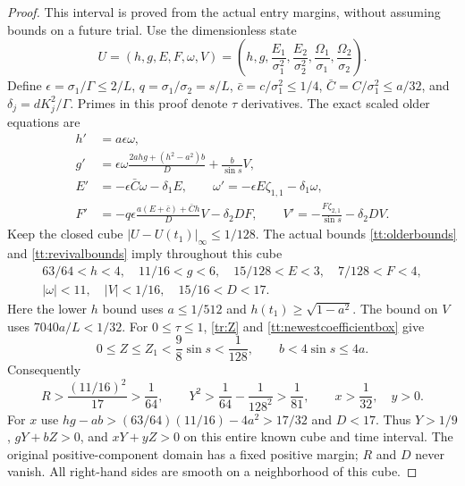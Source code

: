 \begin{proof}
This interval is proved from the actual entry margins, without
assuming bounds on a future trial. Use the dimensionless state
\[
 U=(h,g,E,F,\omega,V)
  =\left(h,g,\frac{E_1}{\sigma_1^2},
       \frac{E_2}{\sigma_2^2},
       \frac{\Omega_1}{\sigma_1},
       \frac{\Omega_2}{\sigma_2}\right).
\]
Define $\epsilon=\sigma_1/\Gamma\leq2/L$,
$q=\sigma_1/\sigma_2=s/L$, $\bar c=c/\sigma_1^2\leq1/4$,
$\bar C=C/\sigma_1^2\leq a/32$, and
$\delta_j=dK_j^2/\Gamma$. Primes in this proof denote $\tau$
derivatives. The exact scaled older equations are
\begin{equation}\label{tr:scaled}
 \begin{aligned}
 h'&=a\epsilon\omega,\\
 g'&=\epsilon\omega\frac{2ahg+(h^2-a^2)b}{D}
                          +\frac b{\sin s}V,\\
 E'&=-\epsilon\bar C\omega-\delta_1E,\qquad
 \omega'=-\epsilon E\zeta_{1,1}-\delta_1\omega,\\
 F'&=-q\epsilon\frac{a(E+\bar c)+\bar Ch}{D}V-\delta_2DF,
 \qquad
 V'=-\frac{F\zeta_{2,1}}{\sin s}-\delta_2DV.
 \end{aligned}
\end{equation}
Keep the closed cube $|U-U(t_1)|_\infty\leq1/128$.
The actual bounds \eqref{tt:olderbounds} and
\eqref{tt:revivalbounds} imply throughout this cube
\[
 \begin{gathered}
 63/64<h<4,\quad 11/16<g<6,\quad
 15/128<E<3,\quad 7/128<F<4,\\
 |\omega|<11,\quad |V|<1/16,\quad
 15/16<D<17.
 \end{gathered}
\]
Here the lower $h$ bound uses $a\leq1/512$ and
$h(t_1)\geq\sqrt{1-a^2}$. The bound on $V$ uses
$7040a/L<1/32$. For $0\leq\tau\leq1$,
\eqref{tr:Z} and \eqref{tt:newestcoefficientbox} give
\[
 0\leq Z\leq Z_1<\frac98\sin s<\frac1{128},
 \qquad b<4\sin s\leq4a.
\]
Consequently
\[
 R>\frac{(11/16)^2}{17}>\frac1{64},\qquad
 Y^2>\frac1{64}-\frac1{128^2}>\frac1{81},
 \qquad x>\frac1{32},\quad y>0.
\]
For $x$ use
$hg-ab>(63/64)(11/16)-4a^2>17/32$ and $D<17$.
Thus $Y>1/9$, $gY+bZ>0$, and $xY+yZ>0$ on this entire
known cube and time interval. The original positive-component
domain has a fixed positive margin; $R$ and $D$ never vanish.
All right-hand sides are smooth on a neighborhood of this cube.


\end{proof}
